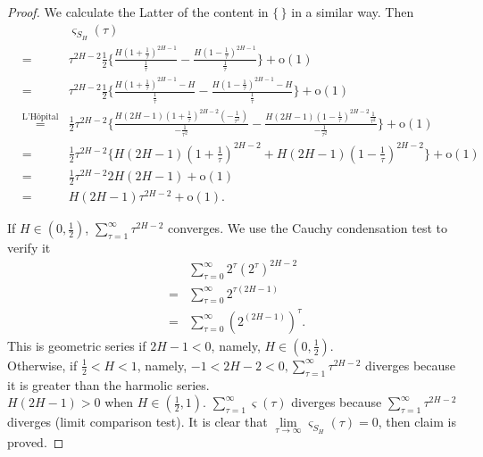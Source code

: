 \documentclass[a4paper, twoside, 11pt]{article}
\theoremstyle{definition}
\begin{document}
\begin{proof}
  We calculate the Latter of the content in $\{\,\}$ in a similar way. Then
  \begin{eqnarray*}
	&&\varsigma_{S_H}(\tau)\\
  &=& \tau^{2H-2} \frac{1}{2}\{ \frac{H(1 +\frac{1}{\tau})^{2H-1}}{\frac{1}{\tau}} - \frac{H(1-\frac{1}{\tau})^{2H-1}}{\frac{1}{\tau}}\}+ \mathrm{o}(1)\\
  &=& \tau^{2H-2} \frac{1}{2}\{ \frac{H(1 +\frac{1}{\tau})^{2H-1}- H}{\frac{1}{\tau}} - \frac{H(1-\frac{1}{\tau})^{2H-1} - H}{\frac{1}{\tau}}\}+ \mathrm{o}(1)\\
  &\overset{\text{L'H\^opital}}{=}& \frac{1}{2} \tau^{2H-2}\{\frac{H(2H-1)(1+\frac{1}{\tau})^{2H-2}(-\frac{1}{\tau^2})}{-\frac{1}{\tau^2}} - \frac{H(2H-1)(1-\frac{1}{\tau})^{2H-2}\frac{1}{\tau^2}}{-\frac{1}{\tau^2}}\}+ \mathrm{o}(1)\\
  &=& \frac{1}{2} \tau^{2H-2}\{H(2H-1)(1+\frac{1}{\tau})^{2H-2} + H(2H-1)(1-\frac{1}{\tau})^{2H-2}\}+ \mathrm{o}(1)\\
  &=& \frac{1}{2} \tau^{2H-2} 2H(2H-1)+ \mathrm{o}(1)\\
  &=& H(2H-1) \tau^{2H-2}+ \mathrm{o}(1).
  \end{eqnarray*}



  If $H \in (0, \frac{1}{2})$, $\sum\limits_{\tau=1}^{\infty} \tau^{2H-2}$ converges. We use the Cauchy condensation test to verify it
   \begin{eqnarray*}
  && \sum_{\tau=0}^{\infty} 2^{\tau} (2^\tau)^{2H-2} \\
  &=& \sum_{\tau=0}^{\infty} 2^{\tau(2H-1)}\\
  &=& \sum_{\tau=0}^{\infty} (2^(2H-1))^\tau.
  \end{eqnarray*}
  This is geometric series if $2H-1<0$, namely, $H\in(0,\frac{1}{2})$.  \\
  Otherwise, if $\frac{1}{2} < H < 1$, namely, $-1<2H-2<0, \sum\limits_{\tau=1}^{\infty} \tau^{2H-2} $ diverges because it is greater than the harmolic series.\\
  $H(2H-1) > 0$ when $H\in (\frac{1}{2}, 1)$. $\sum\limits_{\tau=1}^{\infty} \varsigma(\tau)$ diverges because $\sum\limits_{\tau=1}^{\infty} \tau^{2H-2} $ diverges (limit comparison test). It is clear that $\lim\limits_{\tau\rightarrow \infty}\varsigma_{S_H}(\tau)=0$, then claim is proved. 
  \end{proof}
\end{document}
